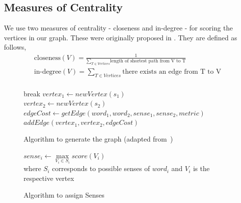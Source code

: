 \documentclass[12pt,letterpaper]{article}
\begin{document}
\subsection{Measures of Centrality}
We use two measures of centrality - closeness and in-degree - for scoring the vertices in our graph. These were originally proposed in \cite{Sinha}. They are defined as follows, \\
\begin{align*} 
\text{closeness}(V)= \frac{1}{\sum\limits_{T \in Vertices}{\text{length of shortest path from V to T}}} \\
\text{in-degree}(V)= \sum\limits_{T \in Vertices} \text{there exists an edge from T to V} \\
\end{align*} 
\begin{figure}
\begin{algorithm}[H]
{
	{
		{
			break
		}
		\Else
		{
			{
				{
					$vertex_1 \gets newVertex(s_1)$ \\
					$vertex_2 \gets newVertex(s_2)$ \\
					$edgeCost \gets getEdge(word_1,word_2,sense_1,sense_2,metric)$ 
					$addEdge(vertex_1,vertex_2,edgeCost)$
				}	
			}
		}
	}
}
\caption{Algorithm to generate the graph (adapted from~\cite{Sinha})}
\end{algorithm}
\begin{algorithm}[H]
{
	$sense_i\gets \max\limits_{V_i \in S_i} score(V_i)$ \\
	where $S_i$ corresponds to possible senses of $word_i$ and $V_i$ is the respective vertex
}
\caption{Algorithm to assign Senses}
\end{algorithm}

\end{figure}
\end{document}
